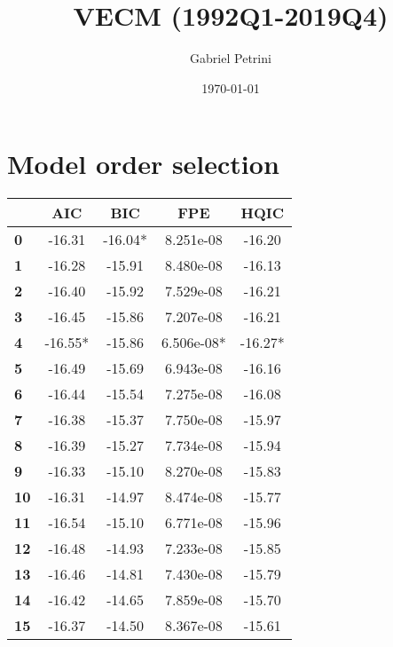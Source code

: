 \documentclass[11pt]{article}
\author{Gabriel Petrini}
\date{\today}
\title{VECM (1992Q1-2019Q4)}
\begin{document}
\maketitle


\section{Model order selection}
\label{sec:org3d9efc6}

\begin{center}
\begin{tabular}{lcccc}
\toprule
            & \textbf{AIC} & \textbf{BIC} & \textbf{FPE} & \textbf{HQIC}  \\
\midrule
\textbf{0}  &      -16.31  &     -16.04*  &   8.251e-08  &       -16.20   \\
\textbf{1}  &      -16.28  &      -15.91  &   8.480e-08  &       -16.13   \\
\textbf{2}  &      -16.40  &      -15.92  &   7.529e-08  &       -16.21   \\
\textbf{3}  &      -16.45  &      -15.86  &   7.207e-08  &       -16.21   \\
\textbf{4}  &     -16.55*  &      -15.86  &  6.506e-08*  &      -16.27*   \\
\textbf{5}  &      -16.49  &      -15.69  &   6.943e-08  &       -16.16   \\
\textbf{6}  &      -16.44  &      -15.54  &   7.275e-08  &       -16.08   \\
\textbf{7}  &      -16.38  &      -15.37  &   7.750e-08  &       -15.97   \\
\textbf{8}  &      -16.39  &      -15.27  &   7.734e-08  &       -15.94   \\
\textbf{9}  &      -16.33  &      -15.10  &   8.270e-08  &       -15.83   \\
\textbf{10} &      -16.31  &      -14.97  &   8.474e-08  &       -15.77   \\
\textbf{11} &      -16.54  &      -15.10  &   6.771e-08  &       -15.96   \\
\textbf{12} &      -16.48  &      -14.93  &   7.233e-08  &       -15.85   \\
\textbf{13} &      -16.46  &      -14.81  &   7.430e-08  &       -15.79   \\
\textbf{14} &      -16.42  &      -14.65  &   7.859e-08  &       -15.70   \\
\textbf{15} &      -16.37  &      -14.50  &   8.367e-08  &       -15.61   \\
\bottomrule
\end{tabular}
\end{center}
\end{document}
